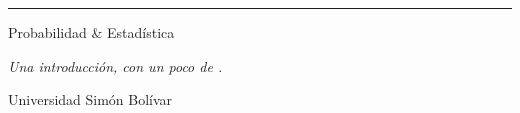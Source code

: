 	\rule{1.5pt}{.87\textheight}
	\hspace{3em}
	\parbox[b]{.75\textwidth}{
	{\Huge Probabilidad \& Estadística\par}
	\vspace{.1\textwidth}
	{\Large\noindent\raggedright\itshape
	Una introducción, con un poco de \R.
	\par}
	\bigskip
	{\large\sffamily\noindent Universidad Simón Bolívar\par}
	\vspace{.75\textwidth}
	}
